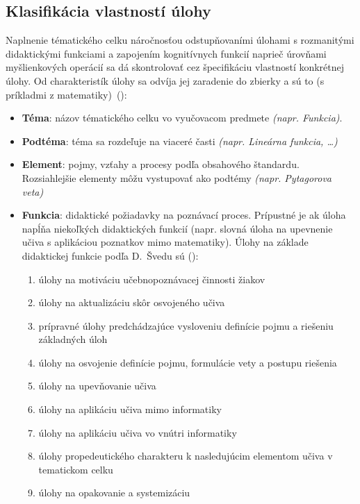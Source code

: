 \subsection{Klasifikácia vlastností úlohy} \label{sec:klasifikacia-ulohy}
Naplnenie tématického celku náročnosťou odstupňovaními úlohami s rozmanitými didaktickými funkciami a zapojením kognitívnych funkcií naprieč úrovňami myšlienkových operácií sa dá skontrolovať cez špecifikáciu vlastností konkrétnej úlohy. Od charakteristík úlohy sa odvíja  jej zaradenie do zbierky a sú to (s príkladmi z matematiky)~(\cite{mindakova_tvorba_2008}):

\begin{itemize}[noitemsep]
\item \textbf{Téma}: názov tématického celku vo vyučovacom predmete \emph{(napr. Funkcia)}.
\item \textbf{Podtéma}: téma sa rozdeľuje na viaceré časti \emph{(napr. Lineárna funkcia, \dots)}
\item \textbf{Element}: pojmy, vzťahy a procesy podľa obsahového štandardu. Rozsiahlejšie elementy môžu vystupovať ako podtémy \emph{(napr. Pytagorova veta)}
\item \textbf{Funkcia}: didaktické požiadavky na poznávací proces. Prípustné je ak úloha napĺňa niekoľkých didaktických funkcií (napr. slovná úloha na upevnenie učiva s aplikáciou poznatkov mimo matematiky). Úlohy na základe didaktickej funkcie podľa D.~Švedu sú (\cite{sveda_ulohy_1992}):
\begin{enumerate}[label=\alph*),noitemsep,topsep=0pt]
\item úlohy na motiváciu učebnopoznávacej činnosti žiakov
\item úlohy na aktualizáciu skôr osvojeného učiva
\item prípravné úlohy predchádzajúce vysloveniu definície pojmu a riešeniu základných úloh 
\item úlohy na osvojenie definície pojmu, formulácie vety a postupu riešenia
\item úlohy na upevňovanie učiva
\item úlohy na aplikáciu učiva mimo informatiky
\item úlohy na aplikáciu učiva vo vnútri informatiky
\item úlohy propedeutického charakteru k nasledujúcim elementom učiva v tematickom celku
\item úlohy na opakovanie a systemizáciu
\end{enumerate}


\end{itemize}
